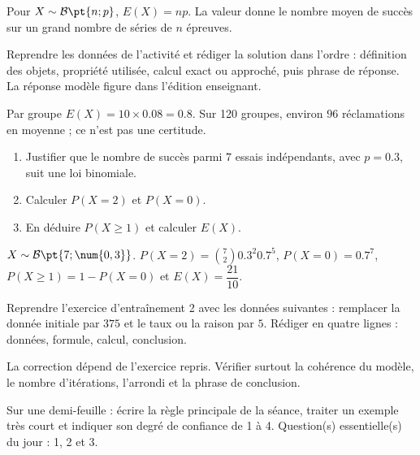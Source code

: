 \begin{summary}Pour $X\sim\mathcal B\pt{n;p}$, $E(X)=np$. La valeur donne le nombre moyen de succès sur un grand nombre de séries de $n$ épreuves.\end{summary}

\begin{example}
Reprendre les données de l'activité et rédiger la solution dans l'ordre : définition des objets, propriété utilisée, calcul exact ou approché, puis phrase de réponse. La réponse modèle figure dans l'édition enseignant.
\end{example}
\begin{solution}Par groupe $E(X)=10\times\num{0,08}=\num{0,8}$. Sur 120 groupes, environ $96$ réclamations en moyenne ; ce n'est pas une certitude.\end{solution}

\begin{exercise}[essentiel]
\begin{enumerate}\item Justifier que le nombre de succès parmi $7$ essais indépendants, avec $p=\num{0,3}$, suit une loi binomiale.\item Calculer $P(X=2)$ et $P(X=0)$.\item En déduire $P(X\geq1)$ et calculer $E(X)$.\end{enumerate}
\end{exercise}
\begin{solution}$X\sim\mathcal B\pt{7;\num{0,3}}$. $P(X=2)=\binom{7}2 \num{0,3}^2 \num{0,7}^{5}$, $P(X=0)=\num{0,7}^{7}$, $P(X\geq1)=1-P(X=0)$ et $E(X)=\dfrac{21}{10}$.\end{solution}


\begin{homework}Reprendre l'exercice d'entraînement 2 avec les données suivantes : remplacer la donnée initiale par $375$ et le taux ou la raison par $5$. Rédiger en quatre lignes : données, formule, calcul, conclusion.\end{homework}
\begin{solution}La correction dépend de l'exercice repris. Vérifier surtout la cohérence du modèle, le nombre d'itérations, l'arrondi et la phrase de conclusion.\end{solution}

\begin{exitticket}[3 minutes]Sur une demi-feuille : écrire la règle principale de la séance, traiter un exemple très court et indiquer son degré de confiance de 1 à 4. Question(s) essentielle(s) du jour : 1, 2 et 3.\end{exitticket}

